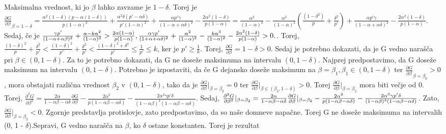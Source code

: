 \documentclass{acm_proc_article-sp}
\begin{document}
Maksimalna vrednost, ki jo $\beta$ lahko zavzame je $1- \delta$. Torej je $\frac{\partial G}{\partial \beta}_{\beta=1-\delta} = \frac{\alpha^2(1- \delta)(p - \alpha(1-\delta))}{p(1-\alpha)^2} + \frac{\alpha^2\delta(p' - \alpha\delta)}{p'(1 - \alpha)^2} + \frac{\alpha p' \gamma}{(1 - \alpha + \alpha\delta)^2} - \frac{2\alpha^2(1-\delta)}{p(1 - \alpha)} = \frac{\alpha^2}{(1-\alpha)^2} - \frac{\alpha^3}{(1 - \alpha)^2}(\frac{(1 - \delta^2)}{p} + \frac{\delta^2}{p'}) + \frac{\alpha p' \gamma}{(1 - \alpha + \alpha\delta)^2} - \frac{2\alpha^2(1 - \delta)}{p(1 - \alpha)}.$ Sedaj, če je $\frac{\gamma p'}{(1 - \alpha + \alpha\beta)^2} + \frac{\alpha - k \alpha^2}{(1 - \alpha)^2} > \\ \frac{2\alpha(1 - \alpha)}{p(1 - \alpha)}, \frac{\alpha\gamma p'}{(1 + \alpha + \alpha\delta)^2} + \frac{\alpha^2}{(1- \alpha)^2} - \frac{k\alpha^3}{(1 - \alpha)^2} - \frac{2\alpha^2(1 - \delta)}{p(1 - \alpha)} > 0.$. Torej, $\frac{(1 - \delta)^2}{p} + \frac{\delta^2}{p'} < \frac{(1 - \delta)^2}{p'} + \frac{\delta^2}{p'} < \frac{(1 - \delta)^2 + \delta^2}{p'} \leq \frac{1}{p'} \leq k$, ker je $p' \geq \frac{1}{k}$.
\newline
Torej, $\frac{\partial G}{\partial \beta} = 1- \delta > 0.$
Sedaj je potrebno dokazati, da je G vedno narašča pri $\beta \in (0, 1- \delta)$. Za to je potrebno dokazati, da G ne doseže maksimuma na intervalu $(0, 1- \delta)$. Najprej predpostavimo, da G doseže maksimum na intervalu $(0, 1- \delta)$. Potrebno je izpostaviti, da če G dejansko doseže maksimum na $\beta = \beta_1, \beta_1 \in (0, 1- \delta)$ ter $\frac{\partial G}{\partial \beta}_{\beta=\beta_0} > 0$, mora obstajati različna vrednost $\beta_2$ v $(0, 1 - \delta)$, tako da je $\frac{\partial G}{\partial \beta}|_{\beta=\beta_2} = 0$ ter $\frac{\partial G}{\partial \beta}|_{\beta\in(\beta_2, 1 - \delta)} > 0$. Torej $\frac{\partial G}{\partial \beta}|_{\beta=\beta_2}$ mora biti večje od 0.
\newline
\newline
Torej, $\frac{\partial^2 G}{\partial \beta^2} = \frac{2\alpha}{1 - \alpha\beta - \alpha\delta} \frac{\partial G}{\partial \beta} - \frac{2 \alpha^2}{p(1 - \alpha\beta - \alpha\delta)} - \frac{2\alpha^3\gamma p' \delta}{(1-\alpha\beta)^3(1 - \alpha\beta - \alpha\delta)}$.
\newline
\newline
Sedaj, $\frac{\partial^2 G}{\partial \beta^2}|_{\beta=\beta_2} = \frac{2\alpha}{1 - \alpha\beta - \alpha\delta} \frac{\partial G}{\partial \beta}|_{\beta=\beta_2} - \\ \frac{2\alpha^2}{p(1 - \alpha\beta - \alpha\delta)} - \frac{2\alpha^3\gamma p' \delta}{(1 - \alpha\beta)^3(1 - \alpha\beta-\alpha\delta)}$. Zato, $\frac{\partial G}{\partial\beta}|_{\beta=\beta_2} < 0$. Zgornje predstavlja protislovje, zato predpostavimo, da so naše domneve napačne. Torej G ne doseže maksimuma na intervalih (0, 1 - $\delta$).Sepravi, G vedno narašča na $\beta$, ko $\delta$ ostane konstanten. Torej je rezultat
\end{document}
